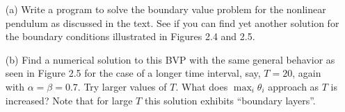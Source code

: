 \documentclass[10pt]{article}
\begin{document}
\maketitle



\begin{problem}
\begin{enumerate}
    \item[(a)] Write a program to solve the boundary value problem for the nonlinear pendulum 
as discussed in the text.  See if you can find yet another solution for the boundary conditions illustrated in Figures 2.4 and 2.5.  

    \item[(b)] Find a numerical solution to this BVP with the same general behavior as seen in Figure 2.5 for the case of a longer time interval, say, \(T = 20\), again with \(\alpha = \beta = 0.7\).  Try larger values of \(T\).  What does \(\max_i \theta_i\) approach as \(T\) is increased?  Note that for large \(T\) this solution exhibits ``boundary layers''.
\end{enumerate}
\end{problem}
\end{document}
